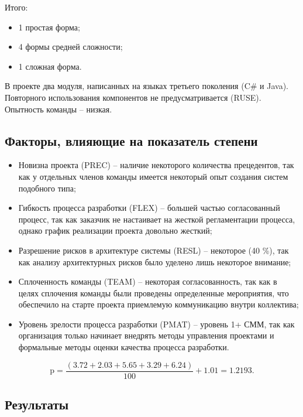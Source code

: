 Итого:

\begin{itemize}
    \item 1 простая форма;
    \item 4 формы средней сложности;
    \item 1 сложная форма.
\end{itemize}

В проекте два модуля, написанных на языках третьего поколения (C\# и Java). Повторного использования компонентов не предусматривается (RUSE). Опытность команды -- низкая.

\subsection{Факторы, влияющие на показатель степени}

\begin{itemize}
    \item Новизна проекта (PREC) -- наличие некоторого количества прецедентов, так как у отдельных членов команды имеется некоторый опыт создания систем подобного типа;
    \item Гибкость процесса разработки (FLEX) -- большей частью согласованный процесс, так как заказчик не настаивает на жесткой регламентации процесса, однако график реализации проекта довольно жесткий;
    \item Разрешение рисков в архитектуре системы (RESL) -- некоторое (40 \%), так как анализу архитектурных рисков было уделено лишь некоторое внимание;
    \item Сплоченность команды (TEAM) -- некоторая согласованность, так как в целях сплочения команды были проведены определенные мероприятия, что обеспечило на старте проекта приемлемую коммуникацию внутри коллектива;
    \item Уровень зрелости процесса разработки (PMAT) -- уровень 1+ СММ, так как организация только начинает внедрять методы управления проектами и формальные методы оценки качества процесса разработки.
\end{itemize}


\begin{equation}
    \text{p} = \frac{(3.72 + 2.03 + 5.65 + 3.29 + 6.24)}{100} + 1.01 = 1.2193.
\end{equation}

\subsection{Результаты}

